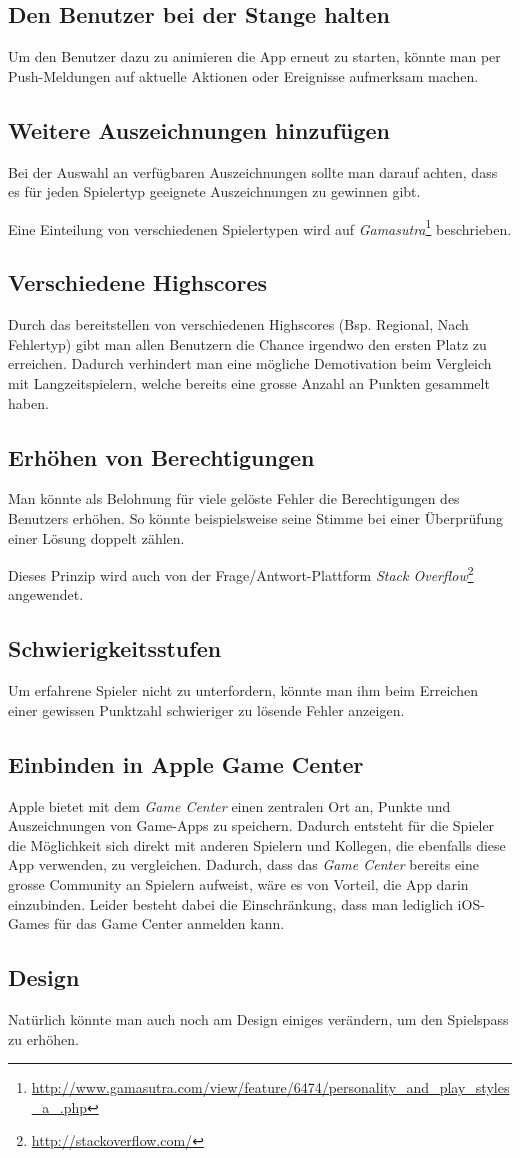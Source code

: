 \subsection{Den Benutzer bei der Stange halten}
Um den Benutzer dazu zu animieren die App erneut zu starten, könnte man per Push-Meldungen auf aktuelle Aktionen oder Ereignisse aufmerksam machen.

\subsection{Weitere Auszeichnungen hinzufügen}
Bei der Auswahl an verfügbaren Auszeichnungen sollte man darauf achten, dass es für jeden Spielertyp geeignete Auszeichnungen zu gewinnen gibt.

Eine Einteilung von verschiedenen Spielertypen wird auf \emph{Gamasutra}\footnote{\url{http://www.gamasutra.com/view/feature/6474/personality_and_play_styles_a_.php}} beschrieben.

\subsection{Verschiedene Highscores}
Durch das bereitstellen von verschiedenen Highscores (Bsp. Regional, Nach Fehlertyp) gibt man allen Benutzern die Chance irgendwo den ersten Platz zu erreichen.
Dadurch verhindert man eine mögliche Demotivation beim Vergleich mit Langzeitspielern, welche bereits eine grosse Anzahl an Punkten gesammelt haben.

\subsection{Erhöhen von Berechtigungen}
Man könnte als Belohnung für viele gelöste Fehler die Berechtigungen des Benutzers erhöhen.
So könnte beispielsweise seine Stimme bei einer Überprüfung einer Lösung doppelt zählen.

Dieses Prinzip wird auch von der Frage/Antwort-Plattform \emph{Stack Overflow}\footnote{\url{http://stackoverflow.com/}} angewendet.

\subsection{Schwierigkeitsstufen}
Um erfahrene Spieler nicht zu unterfordern, könnte man ihm beim Erreichen einer gewissen Punktzahl schwieriger zu lösende Fehler anzeigen.

\subsection{Einbinden in Apple Game Center}
Apple bietet mit dem \emph{Game Center} einen zentralen Ort an, Punkte und Auszeichnungen von Game-Apps zu speichern.
Dadurch entsteht für die Spieler die Möglichkeit sich direkt mit anderen Spielern und Kollegen, die ebenfalls diese App verwenden, zu vergleichen.
Dadurch, dass das \emph{Game Center} bereits eine grosse Community an Spielern aufweist, wäre es von Vorteil, die App darin einzubinden.
Leider besteht dabei die Einschränkung, dass man lediglich iOS-Games für das Game Center anmelden kann.

\subsection{Design}
Natürlich könnte man auch noch am Design einiges verändern, um den Spielspass zu erhöhen.
